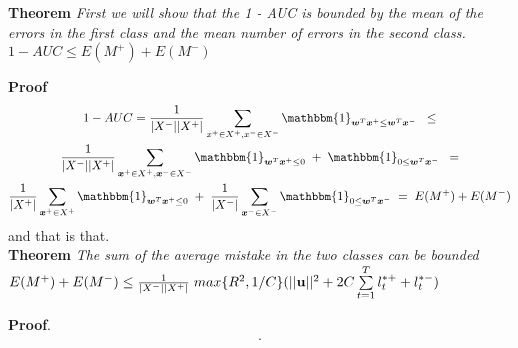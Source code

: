 \documentclass[twoside,11pt]{article}
\newcommand{\vxp}{\vx^+}
\newcommand{\vxn}{\vx^-}
\begin{document}
\noindent

{\bf Theorem} {\it First we will show that the 1 - AUC is bounded by the mean 
of the errors in the first class and the mean number of errors in the second
class.  $1 - AUC \leq E(M^+) + E(M^-)$ 
} \hfill\BlackBox

{\bf Proof} 
\begin{multline}
1 - AUC = \frac{1}{|X^-| |X^+|} \sum\limits_{x^+ \in X^+, x^- \in X^-}{  \mathbbm{1}_{\vw^T \vx^+ \leq \vw^T \vx^-} } \;\;\leq \\
\frac{1}{|X^-| |X^+|}  \sum\limits_{\vxp \in X^+, \vxn \in X^-}{  \mathbbm{1}_{\vw^T \vxp \leq 0} \;+\; \mathbbm{1}_{0 \leq \vw^T \vxn}  }  \;\;= \\
\frac{1}{|X^+|}  \sum\limits_{\vxp \in X^+}{  \mathbbm{1}_{\vw^T \vxp \leq 0} } \;+\; \frac{1}{|X^-|}  \sum\limits_{\vxn \in X^-}{\mathbbm{1}_{0 \leq \vw^T \vxn }  }   \;= \;
E(M^+) + E(M^-)
\end{multline}
and that is that.\\


{\bf Theorem} {\it The sum of the average mistake in the two classes can be bounded \\
$E(M^+) + E(M^-) \leq 
\frac{1}{|X^-| |X^+|} \; max\{R^2, 1/C\}( ||{\bf u}||^2 + 2C \sum\limits_{t=1}^T{ l_t^{*+} + l_t^{*-}} ) $
} \hfill\BlackBox

{\bf Proof}.
\begin{multline}
.
\end{multline}


\vskip 0.2in

\end{document}
